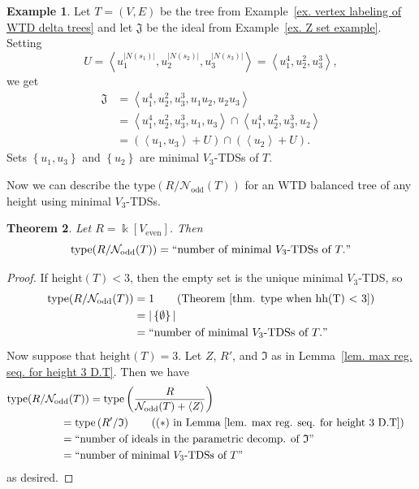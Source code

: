 \documentclass[12pt, reqno]{amsart}
\theoremstyle{definition}
\theoremstyle{plain}
\newtheorem{theorem}{Theorem}[subsection]
\theoremstyle{definition}
\newtheorem{example}[theorem]{Example}
\newcommand{\tp}{\mbox{type}}
\newcommand{\hh}{\mbox{height}}
\newcommand{\kk}{\Bbbk}
\newcommand\gen[1]{\left\langle #1 \right\rangle}
\newcommand\set[1]{\left\lbrace #1 \right\rbrace}
\newcommand{\NN}{\mathcal{N}}
\begin{document}
\begin{example}\label{ex. decomp. of J}
Let $T = (V,E)$ be the tree from Example~\ref{ex. vertex labeling of WTD delta trees} and let $\mathfrak{J}$ be the ideal from Example~\ref{ex. Z set example}.
Setting 
$$
U = \gen{u_1^{|N(s_1)|},u_2^{|N(s_2)|},u_3^{|N(s_3)|}} = \gen{u_1^{4},u_2^2,u_3^3},
$$
we get
\begin{align*}
    \mathfrak{J} &= \gen{u_1^4,u_2^2,u_3^3,u_1u_2,u_2u_3}\\ 
    &= \gen{u_1^4,u_2^2,u_3^3, u_1,u_3} \cap \gen{u_1^4,u_2^2,u_3^3,u_2}\\
    &= \left(\gen{u_1,u_3} + U\right) \cap \left(\gen{u_2} + U \right).
\end{align*}
Sets $\set{u_1,u_3}$ and $\set{u_2}$ are minimal $V_3$-TDSs of $T$.
\end{example}

Now we can describe the $\tp(R/\NN_{\text{odd}}(T))$ for an WTD balanced tree of any height using minimal $V_3$-TDSs.

\begin{theorem}\label{thm. type of WTD delta trees}
    Let $R = \kk[V_{\text{even}}]$.
    Then
    $$
    \tp(R/\NN_{\text{odd}}(T)) = ``\mbox{number of minimal $V_3$-TDSs of } T."
    $$
\end{theorem}

\begin{proof}
    If $\hh(T) < 3$, then the empty set is the unique minimal $V_3$-TDS, so
    \begin{align*}
    \tp(R/\NN_{\text{odd}}(T)) &= 1 \tag{Theorem~\ref{thm. type when hh(T) < 3}}\\
    &= |\set{\emptyset}|\\
    &= ``\mbox{number of minimal $V_3$-TDSs of } T."
    \end{align*}
    Now suppose that $\hh(T) = 3$.
    Let $Z$, $R'$, and $\mathfrak{I}$ as in Lemma~\ref{lem. max reg. seq. for height 3 D.T}.
    Then we have
    \begin{align*}
        \tp(R/\NN_{\text{odd}}(T)) = \tp\left(\frac{R}{\NN_{\text{odd}}(T) + \gen{Z}}\right) \hspace{-5cm}\\
        &= \tp \left(R'/\mathfrak{I} \right) \tag{(\textasteriskcentered{}) in Lemma~\ref{lem. max reg. seq. for height 3 D.T}}\\
        &= ``\mbox{number of ideals in the parametric decomp. of }\mathfrak{I}" \\
        &= ``\mbox{number of minimal $V_3$-TDSs of } T" 
    \end{align*}
as desired.
\end{proof}
\end{document}
